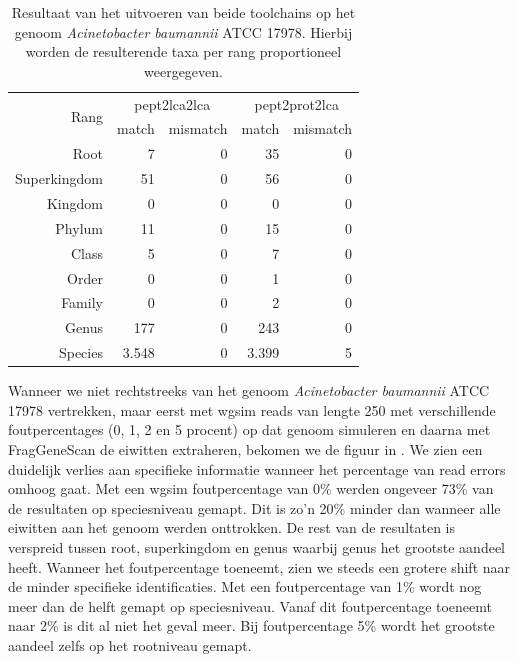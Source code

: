 \begin{table}
	\centering 
	\caption{Resultaat van het uitvoeren van beide toolchains op het
	genoom \textit{Acinetobacter baumannii} ATCC 17978. Hierbij worden de
	resulterende taxa per rang proportioneel weergegeven.}
	\label{tbl:barcharttable}
	\begin{tabular}{r|rr|rr}
	\toprule
	\multirow{2}{*}{Rang} & \multicolumn{2}{c|}{pept2lca2lca} & 
	\multicolumn{2}{c}{pept2prot2lca} \\ 
	& match & mismatch & match & mismatch\\
	\midrule
	Root         & 7     & 0 & 35    & 0\\
	Superkingdom & 51    & 0 & 56    & 0\\
	Kingdom      & 0     & 0 & 0     & 0\\
	Phylum       & 11    & 0 & 15    & 0\\
	Class        & 5     & 0 & 7     & 0\\
	Order        & 0     & 0 & 1     & 0\\
	Family       & 0     & 0 & 2     & 0\\
	Genus        & 177   & 0 & 243   & 0\\
	Species      & 3.548 & 0 & 3.399 & 5\\
	\bottomrule
	\end{tabular}
\end{table}

Wanneer we niet rechtstreeks van het genoom \textit{Acinetobacter baumannii}
ATCC 17978 vertrekken, maar eerst met wgsim reads van lengte 250 met
verschillende foutpercentages (0, 1, 2 en 5 procent) op dat genoom simuleren en
daarna met FragGeneScan de eiwitten extraheren, bekomen we de figuur in
. We zien een duidelijk verlies aan specifieke informatie
wanneer het percentage van read errors omhoog gaat. Met een wgsim foutpercentage
van 0\% werden ongeveer 73\% van de resultaten op speciesniveau gemapt. Dit is
zo'n 20\% minder dan wanneer alle eiwitten aan het genoom werden onttrokken. De
rest van de resultaten is verspreid tussen root, superkingdom en genus waarbij
genus het grootste aandeel heeft. Wanneer het foutpercentage toeneemt, zien we
steeds een grotere shift naar de minder specifieke identificaties. Met een
foutpercentage van 1\% wordt nog meer dan de helft gemapt op speciesniveau.
Vanaf dit foutpercentage toeneemt naar 2\% is dit al niet het geval meer. Bij
foutpercentage 5\% wordt het grootste aandeel zelfs op het rootniveau gemapt.

